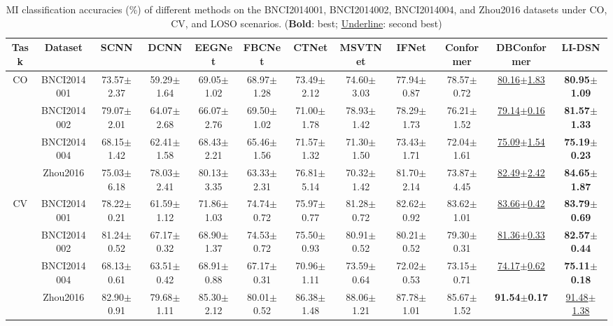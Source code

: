 \documentclass[journal]{IEEEtran}
\theoremstyle{plain}
\begin{document}
     \begin{table}[!t]
\caption{MI classification accuracies (\%) of different methods on the BNCI2014001, BNCI2014002, BNCI2014004, and Zhou2016 datasets under CO, CV, and LOSO scenarios. (\textbf{Bold}: best; \underline{Underline}: second best)}
\centering
\renewcommand{\arraystretch}{1.5}
\setlength{\tabcolsep}{1.1pt}
\begin{tabular}{c|c|cccccccccc}
\hline
\hline
Task & Dataset & SCNN & DCNN & EEGNet & FBCNet & CTNet & MSVTNet & IFNet & Conformer & DBConformer & \textbf{LI-DSN} \\
\hline
\multirow{4}{*}{\centering CO} & BNCI2014001  & 73.57$\pm$2.37 & 59.29$\pm$1.64 & 69.05$\pm$1.02 & 68.97$\pm$1.28 & 73.49$\pm$2.12 & 74.60$\pm$3.03 & 77.94$\pm$0.87 & 78.57$\pm$0.72 & \underline{80.16$\pm$1.83} & \textbf{80.95$\pm$1.09} \\
& BNCI2014002 & 79.07$\pm$2.01 & 64.07$\pm$2.68 & 66.07$\pm$2.76 & 69.50$\pm$1.02 & 71.00$\pm$1.78 & 78.93$\pm$1.42 & 78.29$\pm$1.73 & 76.21$\pm$1.52 &  \underline{79.14$\pm$0.16} & \textbf{81.57$\pm$1.33} \\
& BNCI2014004 & 68.15$\pm$1.42 & 62.41$\pm$1.58 & 68.43$\pm$2.21 & 65.46$\pm$1.56 & 71.57$\pm$1.32 & 71.30$\pm$1.50 & 73.43$\pm$1.71 & 72.04$\pm$1.61 & \underline{75.09$\pm$1.54} & \textbf{75.19$\pm$0.23} \\
& Zhou2016 & 75.03$\pm$6.18 & 78.03$\pm$2.41 & 80.13$\pm$3.35 & 63.33$\pm$2.31 & 76.81$\pm$5.14 & 70.32$\pm$1.42 & 81.70$\pm$2.14 & 73.87$\pm$4.45 & \underline{82.49$\pm$2.42} & \textbf{84.65$\pm$1.87} \\

\hline
\multirow{4}{*}{\centering CV} & BNCI2014001 & 78.22$\pm$0.21 & 61.59$\pm$1.12 & 71.86$\pm$1.03 & 74.74$\pm$0.72 & 75.97$\pm$0.77 & 81.28$\pm$0.72 & 82.62$\pm$0.92 & 83.62$\pm$1.01 & \underline{83.66$\pm$0.42} & \textbf{83.79$\pm$0.69} \\
& BNCI2014002 & 81.24$\pm$0.52 & 67.17$\pm$0.32 & 68.90$\pm$1.37 & 74.53$\pm$0.72 & 75.50$\pm$0.93 & 80.91$\pm$0.52 & 80.21$\pm$0.52 & 79.30$\pm$0.31 & \underline{81.36$\pm$0.33} & \textbf{82.57$\pm$0.44} \\
& BNCI2014004 & 68.13$\pm$0.61 & 63.51$\pm$0.42 & 68.91$\pm$0.88 & 67.17$\pm$0.31 & 70.96$\pm$1.11 & 73.59$\pm$0.64 & 72.02$\pm$0.53 & 73.15$\pm$0.71 & \underline{74.17$\pm$0.62} & \textbf{75.11$\pm$0.18} \\
& Zhou2016 & 82.90$\pm$0.91 & 79.68$\pm$1.11 & 85.30$\pm$2.12 & 80.01$\pm$0.52 & 86.38$\pm$1.48 & 88.06$\pm$1.21 & 87.78$\pm$1.01 & 85.67$\pm$1.52 & \textbf{91.54$\pm$0.17} & \underline{91.48$\pm$1.38} \\


\end{tabular}
\end{table}
\end{document}
